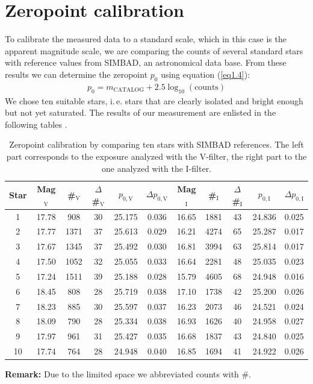 \section{Zeropoint calibration}\label{sec:zeropoint}
To calibrate the measured data to a standard scale, which in this case is the apparent magnitude scale, we are comparing the counts of several standard stars with reference values from SIMBAD, an astronomical data base. From these results we can determine the zeropoint $p_0$ using equation (\ref{eq1.4}): 
	\begin{align*}
		p_0 = m_{\text{CATALOG}} + 2.5\log_{10}(\text{counts})
	\end{align*}
	We chose ten suitable stars, i.\,e. stars that are clearly isolated and bright enough but not yet saturated. 
\newpage
The results of our measurement are enlisted in the following tables
.
	
	\begin{table}[H]
\setlength{\tabcolsep}{2mm}
\renewcommand{\arraystretch}{1.5}
\begin{adjustbox}{width=\textwidth} 
\begin{tabular}{c|c c c c c|c c c c c}

Star & Mag$_{\text{V}}$ & \#$_{\text{V}}$ & $\Delta$\#$_{\text{V}}$ & $p_{0,\text{V}}$ &$\Delta p_{0,\text{V}}$ & Mag$_{\text{I}}$ & \#$_{\text{I}}$ & $\Delta$\#$_{\text{I}}$ & $p_{0,\text{I}}$ &$\Delta p_{0,\text{I}}$\\ \hline 
1 & 17.78 & 908 & 30 & 25.175 & 0.036 & 16.65 & 1881 & 43 & 24.836 & 0.025 \\
2 & 17.77 & 1371 & 37 & 25.613 & 0.029 & 16.21 & 4274 & 65 & 25.287 & 0.017 \\
3 & 17.67 & 1345 & 37 & 25.492 & 0.030 & 16.81 & 3994 & 63 & 25.814 & 0.017 \\
4 & 17.50 & 1052 & 32 & 25.055 & 0.033 & 16.64 & 2281 & 48 & 25.035 & 0.023 \\
5 & 17.24 & 1511 & 39 & 25.188& 0.028 & 15.79 & 4605 & 68 & 24.948 & 0.016 \\
6 & 18.45 & 808 & 28 & 25.719 & 0.038 & 17.10 & 1738 & 42 &  25.200 & 0.026 \\
7 & 18.23 & 885 & 30 & 25.597 & 0.037 & 16.23 & 2073 & 46 &  24.521 & 0.024 \\
8 & 18.09 & 790 & 28 & 25.334 & 0.038 & 16.93 & 1626 & 40 & 24.958 & 0.027 \\
9 & 17.97 & 961 & 31 & 25.427 & 0.035 & 16.68 & 1837 & 43 &  24.840 & 0.025 \\
10 & 17.74 & 764 & 28 & 24.948 & 0.040 & 16.85 &  1694 & 41 & 24.922 & 0.026 \\

\end{tabular}
\end{adjustbox}
\caption{\label{tab:2} Zeropoint calibration by comparing ten stars with SIMBAD references. The left part corresponds to the exposure analyzed with the V-filter, the right part to the one analyzed with the I-filter.}
\end{table}
\textbf{Remark:} Due to the limited space we abbreviated counts with $\#$. \\
	

